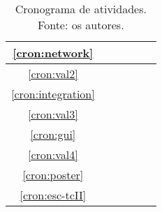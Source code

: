 \begin{table}[!htbp]
\begin{tabular}{|c|c|c|c|c|c|}
        \hline
        \ref{cron:network}      &                           &                     & \cellcolor{midgray} &                     &                     \\
        \hline
        \ref{cron:val2}         &                           &                     & \cellcolor{midgray} &                     &                     \\
        \hline
        \ref{cron:integration}  &                           &                     &                     & \cellcolor{midgray} &                     \\
        \hline
        \ref{cron:val3}         &                           &                     &                     & \cellcolor{midgray} &                     \\
        \hline
        \ref{cron:gui}          &                           &                     &                     & \cellcolor{midgray} &                     \\
        \hline
        \ref{cron:val4}         &                           &                     &                     & \cellcolor{midgray} &                     \\
        \hline
        \ref{cron:poster}       &                           &                     &                     & \cellcolor{midgray} &                     \\
        \hline
        \ref{cron:esc-tcII}     &                           &                     &                     &                     & \cellcolor{midgray} \\
        \hline
    \end{tabular}
    \caption{\label{tab:schedule}
        Cronograma de atividades.\\
        Fonte: os autores.
    }
\end{table}









